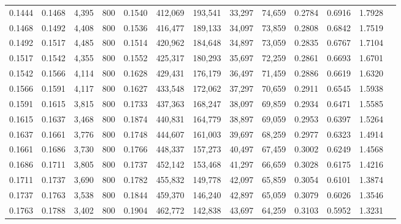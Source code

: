 \begin{tabular}{rrrrrrrrrrrrr}
0.1444 & 0.1468 &  4,395 &   800 &                                     0.1540 & 412,069 & 193,541 &  33,297 &  74,659 & 0.2784 & 0.6916 & 1.7928 \\
0.1468 & 0.1492 &  4,408 &   800 &                                     0.1536 & 416,477 & 189,133 &  34,097 &  73,859 & 0.2808 & 0.6842 & 1.7519 \\
0.1492 & 0.1517 &  4,485 &   800 &                                     0.1514 & 420,962 & 184,648 &  34,897 &  73,059 & 0.2835 & 0.6767 & 1.7104 \\
0.1517 & 0.1542 &  4,355 &   800 &                                     0.1552 & 425,317 & 180,293 &  35,697 &  72,259 & 0.2861 & 0.6693 & 1.6701 \\
0.1542 & 0.1566 &  4,114 &   800 &                                     0.1628 & 429,431 & 176,179 &  36,497 &  71,459 & 0.2886 & 0.6619 & 1.6320 \\
0.1566 & 0.1591 &  4,117 &   800 &                                     0.1627 & 433,548 & 172,062 &  37,297 &  70,659 & 0.2911 & 0.6545 & 1.5938 \\
0.1591 & 0.1615 &  3,815 &   800 &                                     0.1733 & 437,363 & 168,247 &  38,097 &  69,859 & 0.2934 & 0.6471 & 1.5585 \\
0.1615 & 0.1637 &  3,468 &   800 &                                     0.1874 & 440,831 & 164,779 &  38,897 &  69,059 & 0.2953 & 0.6397 & 1.5264 \\
0.1637 & 0.1661 &  3,776 &   800 &                                     0.1748 & 444,607 & 161,003 &  39,697 &  68,259 & 0.2977 & 0.6323 & 1.4914 \\
0.1661 & 0.1686 &  3,730 &   800 &                                     0.1766 & 448,337 & 157,273 &  40,497 &  67,459 & 0.3002 & 0.6249 & 1.4568 \\
0.1686 & 0.1711 &  3,805 &   800 &                                     0.1737 & 452,142 & 153,468 &  41,297 &  66,659 & 0.3028 & 0.6175 & 1.4216 \\
0.1711 & 0.1737 &  3,690 &   800 &                                     0.1782 & 455,832 & 149,778 &  42,097 &  65,859 & 0.3054 & 0.6101 & 1.3874 \\
0.1737 & 0.1763 &  3,538 &   800 &                                     0.1844 & 459,370 & 146,240 &  42,897 &  65,059 & 0.3079 & 0.6026 & 1.3546 \\
0.1763 & 0.1788 &  3,402 &   800 &                                     0.1904 & 462,772 & 142,838 &  43,697 &  64,259 & 0.3103 & 0.5952 & 1.3231 \\

\end{tabular}
